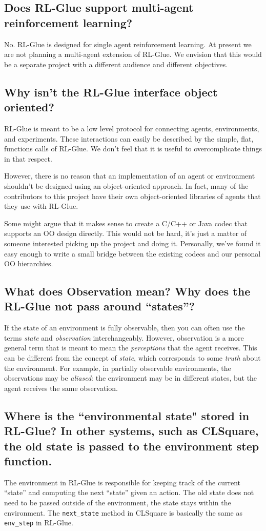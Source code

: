 \documentclass[11pt]{article}
\begin{document}
\subsection{Does RL-Glue support multi-agent reinforcement learning?}
 No. RL-Glue is designed for single agent reinforcement learning. At present we are not planning a multi-agent extension of RL-Glue. We envision that this would be a separate project with a different audience and different objectives.  
 
\subsection{Why isn't the RL-Glue interface object oriented?}
RL-Glue is meant to be a low level protocol for connecting agents, environments, and experiments.  These interactions can
easily be described by the simple, flat, functions calls of RL-Glue.  We don't feel that it is useful to overcomplicate
things in that respect.

However, there is no reason that an implementation of an agent or environment shouldn't be designed using an object-oriented 
approach.  In fact, many of the contributors to this project have their own object-oriented libraries of agents that 
they use with RL-Glue.

Some might argue that it makes sense to create a C/C++ or Java codec that supports an OO design
directly.  This would not be hard, it's just a matter of someone interested picking up the project and doing it.  Personally, 
we've found it easy enough to write a small bridge between the existing codecs and our personal OO hierarchies.

\subsection{What does Observation mean? Why does the RL-Glue not pass around ``states''?}
If the state of an environment is fully observable, then you can often use the terms \textit{state} and \textit{observation} interchangeably. However, 
observation is a more  general term that is meant to mean the \textit{perceptions} that the agent receives.  This can be different 
from the concept of \textit{state}, which corresponds to some \textit{truth} about the environment.  For example, in partially observable environments, the observations
may be \textit{aliased}: the environment may be in different states, but the agent receives the same observation. 


\subsection{Where is the ``environmental state" stored in RL-Glue? In other systems, such as CLSquare, the old state is passed to the environment step function.}
The environment in RL-Glue is responsible for keeping  track of the current ``state'' and computing the next ``state'' given an action. The old state does not need to be passed
outside of the environment, the state stays within the  environment. The \texttt{next\_state} method in CLSquare is basically the same as \texttt{env\_step} in RL-Glue.
\end{document}
